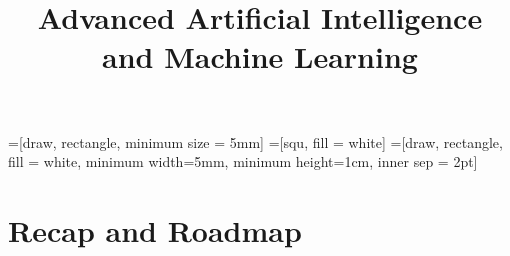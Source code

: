 




\newcommand{\ques}{\textbf{\textcolor{red}{Question:  }}}
\newcommand{\citebutton}[2]{\beamergotobutton{\href{#2}{#1}}}
=[draw, rectangle, minimum size = 5mm]
=[squ, fill = white]
=[draw, rectangle, fill = white, minimum width=5mm, minimum height=1cm, inner sep = 2pt]

\newcommand{\titlefigure}{figure/vit-patches.png}
\newcommand{\learninggoals}{
  \item Vision Transformers: how an image becomes a token sequence, and why CNN's inductive biases (locality, translation equivariance) are a data-efficiency trade-off, not a hard requirement
  \item Making ViT practical: windowed/hierarchical attention (Swin) and training without massive data via distillation (DeiT)
  \item DETR and MaskFormer: object detection and segmentation as set prediction with a non-autoregressive decoder -- a third encoder-decoder pattern alongside T5's and Whisper's autoregressive ones
  \item Two ways to combine modalities: contrastive dual-encoders (CLIP, incl.\ its actual training objective) vs.\ fusion architectures, and where image captioning and text-to-image generation fit
  \item Unified, domain-agnostic architectures (Gato, OFA): the same recipe applied to text, images, robot actions, and arbitrary tasks alike
  \item Video Transformers: factorizing space and time (ViViT, TimeSformer) to keep attention tractable
  \item That every family and pattern from sessions 7-9 generalizes past text -- this was never an NLP-only architecture
}

\title{Advanced Artificial Intelligence and Machine Learning}
\date{}




\section{Recap and Roadmap}

